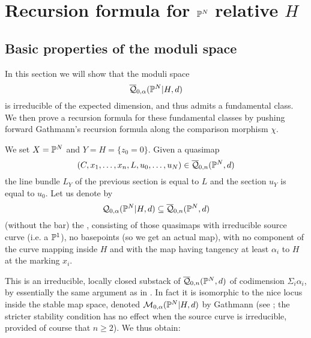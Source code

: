 \section{Recursion formula for $\mathbb P^N$ relative $H$} \label{Section recursion for PN}

\subsection{Basic properties of the moduli space} \label{Subsection basic properties of the moduli space}
In this section we will show that the moduli space
\begin{equation*} \overline{\mathcal Q}_{0,\alpha}(\mathbb P^N|H,d) \end{equation*}
is irreducible of the expected dimension, and thus admits a fundamental class. We then prove a recursion formula for these fundamental classes by pushing forward Gathmann's recursion formula along the comparison morphism $\chi$.

We set $X=\mathbb P^N$ and $Y=H=\{ z_0 = 0 \}$. Given a quasimap
\begin{equation*} (C,x_1,\ldots,x_n,L,u_0,\ldots,u_N) \in \overline{\mathcal Q}_{0,n}(\mathbb P^N,d) \end{equation*}
the line bundle $L_Y$ of the previous section is equal to $L$ and the section $u_Y$ is equal to $u_0$. Let us denote by
\begin{equation*} \mathcal Q_{0,\alpha}(\mathbb P^N|H,d) \subseteq \overline{\mathcal Q}_{0,n}(\mathbb P^N,d) \end{equation*}
(without the bar) the , consisting of those quasimaps with irreducible source curve (i.e. a $\mathbb P^1$), no basepoints (so we get an actual map), with no component of the curve mapping inside $H$ and with the map having tangency at least $\alpha_i$ to $H$ at the marking $x_i$.

This is an irreducible, locally closed substack of $\overline{\mathcal Q}_{0,n}(\mathbb P^N,d)$ of codimension $\Sigma_i \alpha_i$, by essentially the same argument as in \cite[Lemma 1.8]{Ga}. In fact it is isomorphic to the nice locus inside the stable map space, denoted $\mathcal M_{0,\alpha}(\mathbb P^N|H,d)$ by Gathmann (see \cite[Def. 1.6]{Ga}; the stricter stability condition has no effect when the source curve is irreducible, provided of course that $n\geq2$). We thus obtain:

